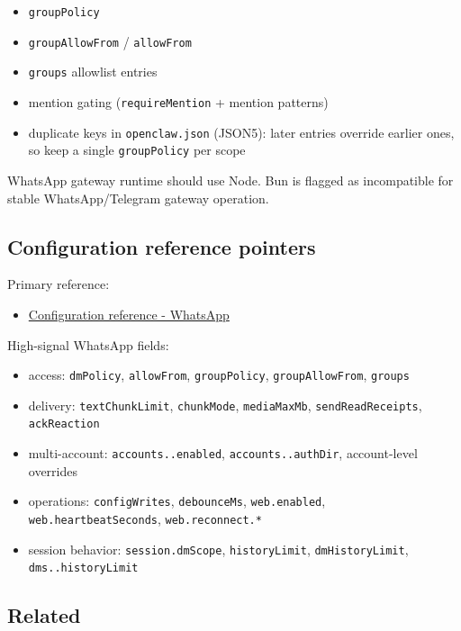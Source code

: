 \begin{itemize}
  \item \texttt{groupPolicy}
  \item \texttt{groupAllowFrom} / \texttt{allowFrom}
  \item \texttt{groups} allowlist entries
  \item mention gating (\texttt{requireMention} + mention patterns)
  \item duplicate keys in \texttt{openclaw.json} (JSON5): later entries override earlier ones, so keep a single \texttt{groupPolicy} per scope
\end{itemize}



WhatsApp gateway runtime should use Node. Bun is flagged as incompatible for stable WhatsApp/Telegram gateway operation.

\subsection{Configuration reference pointers}


Primary reference:

\begin{itemize}
  \item \href{/gateway/configuration-reference\#whatsapp}{Configuration reference - WhatsApp}
\end{itemize}


High-signal WhatsApp fields:

\begin{itemize}
  \item access: \texttt{dmPolicy}, \texttt{allowFrom}, \texttt{groupPolicy}, \texttt{groupAllowFrom}, \texttt{groups}
  \item delivery: \texttt{textChunkLimit}, \texttt{chunkMode}, \texttt{mediaMaxMb}, \texttt{sendReadReceipts}, \texttt{ackReaction}
  \item multi-account: \texttt{accounts..enabled}, \texttt{accounts..authDir}, account-level overrides
  \item operations: \texttt{configWrites}, \texttt{debounceMs}, \texttt{web.enabled}, \texttt{web.heartbeatSeconds}, \texttt{web.reconnect.*}
  \item session behavior: \texttt{session.dmScope}, \texttt{historyLimit}, \texttt{dmHistoryLimit}, \texttt{dms..historyLimit}
\end{itemize}


\subsection{Related}


